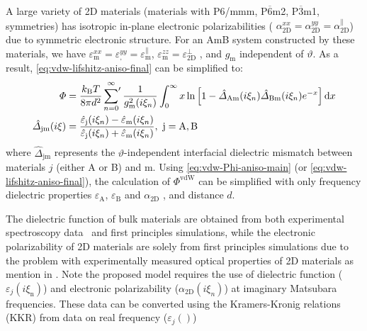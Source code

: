 A large variety of 2D materials (\eg materials with P6/mmm,
P$\overline{6}$m2, P$\overline{3}$m1, 
symmetries) has isotropic in-plane electronic polarizabilities (\ie
$\alpha^{xx}_{\mathrm{2D}} = \alpha_{\mathrm{2D}}^{yy} = \alpha_{\mathrm{2D}}^{\parallel}$) due to
symmetric electronic structure. For an AmB system constructed by these
materials, we have
$\varepsilon_{\mathrm{m}}^{xx} =
\varepsilon_{\mathrm{,}}^{yy}=\varepsilon_{\mathrm{m}}^{\parallel}$,
$\varepsilon_{\mathrm{m}}^{zz} = \varepsilon_{\mathrm{2D}}^{\perp}$ ,
and $g_{\mathrm{m}}$ independent of $\vartheta$. As a result,
\autoref{eq:vdw-lifshitz-aniso-final} can be simplified to:
\begin{equation}
  \begin{aligned}[t]
\label{eq:vdw-Phi-aniso-main}
\Phi &= \frac{k_{\mathrm{B}} T}{8 \pi d^{2}} 
\sideset{}{'} \sum_{n = 0}^{\infty} \frac{1}{g_{\mathrm{m}}^{2}(i \xi_{n})}
\int_{0}^{\infty} x \ln\left[1 - \hat{\Delta}_{\mathrm{Am}}(i \xi_{n}) \hat{\Delta}_{\mathrm{Bm}}(i \xi_{n}) e^{-x}\right] \mathrm{d} x \\
\hat{\Delta}_{\mathrm{jm}}(i\xi) &= \frac{\hat{\varepsilon}_{\mathrm{j}}(i\xi_{n}) -
\hat{\varepsilon}_{\mathrm{m}}(i\xi_{n})}{\hat{\varepsilon}_{\mathrm{j}}(i\xi_{n}) +
\hat{\varepsilon}_{\mathrm{m}}(i\xi_{n})},\ \mathrm{j=A, B}
\end{aligned}
\end{equation}
where
\(\hat{\Delta}_{\mathrm{jm}}\) represents the
$\vartheta$-independent interfacial dielectric mismatch between
materials $j$ (either A or B) and m.
%
Using \autoref{eq:vdw-Phi-aniso-main} (or
\autoref{eq:vdw-lifshitz-aniso-final}), the calculation of
$\Phi^{\mathrm{vdW}}$ can be simplified with only frequency dielectric
properties $\varepsilon_{\mathrm{A}}$, $\varepsilon_{\mathrm{B}}$ and
$\alpha_{\mathrm{2D}}$ , and distance $d$.
%


The dielectric function of bulk materials are obtained from both
experimental spectroscopy data~\cite{Palik_1998_handbook} and first
principles simulations, while the electronic polarizability of 2D
materials are solely from first principles simulations due to the
problem with experimentally measured optical properties of 2D
materials as mention in . Note the
proposed model requires the use of dielectric function
($\varepsilon_{j}(i \xi_{\mathrm{n}})$) and electronic polarizability
($\alpha_{\mathrm{2D}}(i \xi_{n})$) at imaginary Matsubara
frequencies. These data can be converted using the Kramers-Kronig
relations (KKR) from data on real frequency ($\varepsilon_{j}()$)

